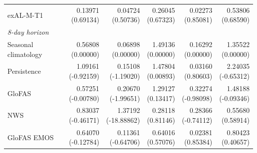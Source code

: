 \begin{table}[!htbp]
\begin{threeparttable}
\begin{tabular}{lrrrrr}
exAL-M-T1 & \shortstack[r]{0.13971\\(0.69134)} & \shortstack[r]{0.04724\\(0.50736)} & \shortstack[r]{0.26045\\(0.67323)} & \shortstack[r]{0.02273\\(0.85081)} & \shortstack[r]{0.53806\\(0.68590)} \\
\multicolumn{6}{l}{\textit{8-day horizon}} \\
Seasonal climatology & \shortstack[r]{0.56808\\(0.00000)} & \shortstack[r]{0.06898\\(0.00000)} & \shortstack[r]{1.49136\\(0.00000)} & \shortstack[r]{0.16292\\(0.00000)} & \shortstack[r]{1.35522\\(0.00000)} \\
Persistence & \shortstack[r]{1.09161\\(-0.92159)} & \shortstack[r]{0.15108\\(-1.19020)} & \shortstack[r]{1.47804\\(0.00893)} & \shortstack[r]{0.03160\\(0.80603)} & \shortstack[r]{2.24035\\(-0.65312)} \\
GloFAS & \shortstack[r]{0.57251\\(-0.00780)} & \shortstack[r]{0.20670\\(-1.99651)} & \shortstack[r]{1.29127\\(0.13417)} & \shortstack[r]{0.32274\\(-0.98098)} & \shortstack[r]{1.48188\\(-0.09346)} \\
NWS & \shortstack[r]{0.83037\\(-0.46171)} & \shortstack[r]{1.37192\\(-18.88862)} & \shortstack[r]{0.28118\\(0.81146)} & \shortstack[r]{0.28366\\(-0.74112)} & \shortstack[r]{0.55680\\(0.58914)} \\
GloFAS EMOS & \shortstack[r]{0.64070\\(-0.12784)} & \shortstack[r]{0.11361\\(-0.64706)} & \shortstack[r]{0.64016\\(0.57076)} & \shortstack[r]{0.02381\\(0.85384)} & \shortstack[r]{0.80423\\(0.40657)} \\

\end{tabular}
\end{threeparttable}
\end{table}
